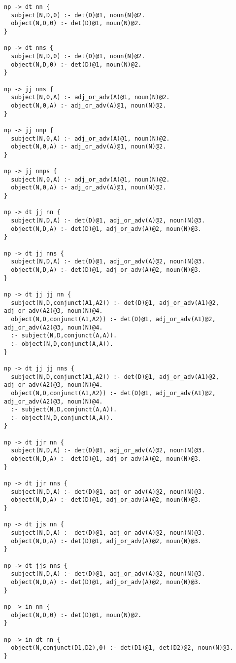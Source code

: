 \begin{lstlisting}
np -> dt nn {
  subject(N,D,0) :- det(D)@1, noun(N)@2.
  object(N,D,0) :- det(D)@1, noun(N)@2.
}

np -> dt nns {
  subject(N,D,0) :- det(D)@1, noun(N)@2.
  object(N,D,0) :- det(D)@1, noun(N)@2.
}

np -> jj nns {
  subject(N,0,A) :- adj_or_adv(A)@1, noun(N)@2.
  object(N,0,A) :- adj_or_adv(A)@1, noun(N)@2.
}

np -> jj nnp {
  subject(N,0,A) :- adj_or_adv(A)@1, noun(N)@2.
  object(N,0,A) :- adj_or_adv(A)@1, noun(N)@2.
}

np -> jj nnps {
  subject(N,0,A) :- adj_or_adv(A)@1, noun(N)@2.
  object(N,0,A) :- adj_or_adv(A)@1, noun(N)@2.
}

np -> dt jj nn {
  subject(N,D,A) :- det(D)@1, adj_or_adv(A)@2, noun(N)@3.
  object(N,D,A) :- det(D)@1, adj_or_adv(A)@2, noun(N)@3.
}

np -> dt jj nns {
  subject(N,D,A) :- det(D)@1, adj_or_adv(A)@2, noun(N)@3.
  object(N,D,A) :- det(D)@1, adj_or_adv(A)@2, noun(N)@3.
}

np -> dt jj jj nn {
  subject(N,D,conjunct(A1,A2)) :- det(D)@1, adj_or_adv(A1)@2, adj_or_adv(A2)@3, noun(N)@4.
  object(N,D,conjunct(A1,A2)) :- det(D)@1, adj_or_adv(A1)@2, adj_or_adv(A2)@3, noun(N)@4.
  :- subject(N,D,conjunct(A,A)).
  :- object(N,D,conjunct(A,A)).
}

np -> dt jj jj nns {
  subject(N,D,conjunct(A1,A2)) :- det(D)@1, adj_or_adv(A1)@2, adj_or_adv(A2)@3, noun(N)@4.
  object(N,D,conjunct(A1,A2)) :- det(D)@1, adj_or_adv(A1)@2, adj_or_adv(A2)@3, noun(N)@4.
  :- subject(N,D,conjunct(A,A)).
  :- object(N,D,conjunct(A,A)).
}

np -> dt jjr nn {
  subject(N,D,A) :- det(D)@1, adj_or_adv(A)@2, noun(N)@3.
  object(N,D,A) :- det(D)@1, adj_or_adv(A)@2, noun(N)@3.
}

np -> dt jjr nns {
  subject(N,D,A) :- det(D)@1, adj_or_adv(A)@2, noun(N)@3.
  object(N,D,A) :- det(D)@1, adj_or_adv(A)@2, noun(N)@3.
}

np -> dt jjs nn {
  subject(N,D,A) :- det(D)@1, adj_or_adv(A)@2, noun(N)@3.
  object(N,D,A) :- det(D)@1, adj_or_adv(A)@2, noun(N)@3.
}

np -> dt jjs nns {
  subject(N,D,A) :- det(D)@1, adj_or_adv(A)@2, noun(N)@3.
  object(N,D,A) :- det(D)@1, adj_or_adv(A)@2, noun(N)@3.
}

np -> in nn {
  object(N,D,0) :- det(D)@1, noun(N)@2.
}

np -> in dt nn {
  object(N,conjunct(D1,D2),0) :- det(D1)@1, det(D2)@2, noun(N)@3.
}


\end{lstlisting}
